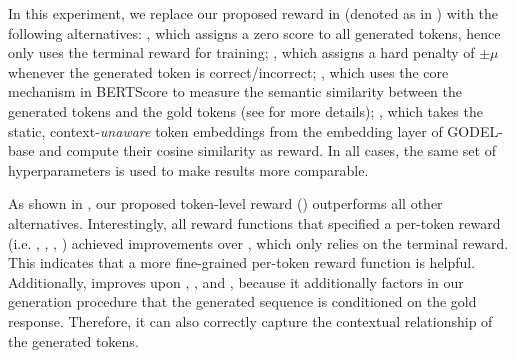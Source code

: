 In this experiment, we replace our proposed reward in  (denoted as  in ) with the following alternatives: , which assigns a zero score to all generated tokens, hence only uses the terminal reward for training; 
, which assigns a hard penalty of $\pm \mu$ whenever the generated token is correct/incorrect; 
, which uses the core mechanism in BERTScore \cite{BERTScore} to measure the semantic similarity between the generated tokens and the gold tokens (see  for more details); 
, which takes the static, context-\emph{unaware} token embeddings from the embedding layer of GODEL-base and compute their cosine similarity as reward. In all cases, the same set of hyperparameters is used to make results more comparable.
\begin{table}[t]
  \centering
  \caption{KRLS using different per-token reward when trained from a finetuned checkpoint. \emph{None} refers to the baseline of training only with supervised learning.}
  \label{tbl:token_level_semantic_score_finetuned}
\end{table}

As shown in , our proposed token-level reward () outperforms all other alternatives. Interestingly, all reward functions that specified a per-token reward (i.e. , , , ) achieved improvements over , which only relies on the terminal reward. This indicates that a more fine-grained per-token reward function is helpful. Additionally,  improves upon , , and , because it additionally factors in our generation procedure that the generated sequence is conditioned on the gold response. Therefore, it can also correctly capture the contextual relationship of the generated tokens.
